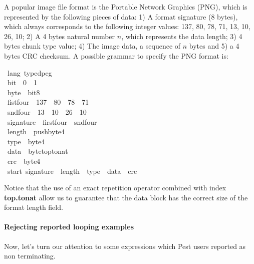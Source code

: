\documentclass[sigplan,screen]{acmart}
\theoremstyle{definition}
\begin{document}
A popular image file format is the Portable Network Graphics (PNG), which
is represented by the following pieces of data: 1)
A format signature (8 bytes), which always corresponds to the
following integer values: 137, 80, 78, 71, 13, 10, 26, 10;
2) A 4 bytes natural number $n$, which represents the data length;
3) 4 bytes chunk type value;
4) The image data, a sequence of $n$ bytes and
5) a 4 bytes CRC checksum.
A possible grammar to specify the PNG format is:
\begin{tabbing}\ttfamily
~lang~typedpeg\\
\ttfamily ~bit~~0~~1\\
\ttfamily ~byte~~bit8\\
\ttfamily ~fistfour~~137~~80~~78~~71\\
\ttfamily ~sndfour~~13~~10~~26~~10\\
\ttfamily ~signature~~firstfour~~sndfour\\
\ttfamily ~length~~pushbyte4\\
\ttfamily ~type~~byte4\\
\ttfamily ~data~~bytetoptonat\\
\ttfamily ~crc~~byte4\\
\ttfamily ~start~signature~~length~~type~~data~~crc
\end{tabbing}
Notice that the use of an exact repetition operator combined with
index \textbf{top.tonat} allow us to guarantee that the data block
has the correct size of the format length field.

\paragraph{Rejecting reported looping examples} Now, let's turn our
attention to some expressions which Pest users reported as
non terminating.
\end{document}
